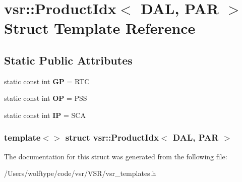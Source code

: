\hypertarget{structvsr_1_1_product_idx_3_01_d_a_l_00_01_p_a_r_01_4}{\section{vsr\-:\-:Product\-Idx$<$ D\-A\-L, P\-A\-R $>$ Struct Template Reference}
\label{structvsr_1_1_product_idx_3_01_d_a_l_00_01_p_a_r_01_4}
}
\subsection*{Static Public Attributes}
\begin{DoxyCompactItemize}
\item 
\hypertarget{structvsr_1_1_product_idx_3_01_d_a_l_00_01_p_a_r_01_4_ac72b3fce2daaddeebf11e231e473e584}{static const int {\bfseries G\-P} = R\-T\-C}\label{structvsr_1_1_product_idx_3_01_d_a_l_00_01_p_a_r_01_4_ac72b3fce2daaddeebf11e231e473e584}

\item 
\hypertarget{structvsr_1_1_product_idx_3_01_d_a_l_00_01_p_a_r_01_4_a0ca8f3eb43b473b2e415aae411662d3e}{static const int {\bfseries O\-P} = P\-S\-S}\label{structvsr_1_1_product_idx_3_01_d_a_l_00_01_p_a_r_01_4_a0ca8f3eb43b473b2e415aae411662d3e}

\item 
\hypertarget{structvsr_1_1_product_idx_3_01_d_a_l_00_01_p_a_r_01_4_a5d06b2adfb57b0c6fbbe29066ebc2575}{static const int {\bfseries I\-P} = S\-C\-A}\label{structvsr_1_1_product_idx_3_01_d_a_l_00_01_p_a_r_01_4_a5d06b2adfb57b0c6fbbe29066ebc2575}

\end{DoxyCompactItemize}
\subsubsection*{template$<$$>$ struct vsr\-::\-Product\-Idx$<$ D\-A\-L, P\-A\-R $>$}



The documentation for this struct was generated from the following file\-:\begin{DoxyCompactItemize}
\item 
/\-Users/wolftype/code/vsr/\-V\-S\-R/vsr\-\_\-templates.\-h\end{DoxyCompactItemize}
